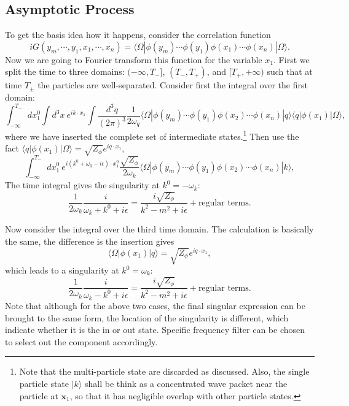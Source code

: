 \documentclass[aps,prb,superscriptaddress,nofootinbib]{revtex4}
\begin{document}
\subsection{Asymptotic Process}
To get the basis idea how it happens, consider the correlation function
\begin{equation}
	iG(y_m,\cdots,y_1,x_1,\cdots,x_n) = \langle\Omega|\phi(y_m)\cdots\phi(y_1) \phi(x_1)\cdots\phi(x_n)|\Omega\rangle.
\end{equation}
Now we are going to Fourier transform this function for the variable $x_1$.
First we split the time to three domains: $(-\infty,T_-]$, $(T_-,T_+)$, and $[T_+,+\infty)$ such that at time $T_{\pm}$ the particles are well-separated.
Consider first the integral over the first domain:
\begin{equation}
	\int_{-\infty}^{T_-} dx_1^0 \int d^3 x\ e^{i k\cdot x_1} \int \frac{d^3q}{(2\pi)^3}\frac{1}{2\omega_q}\langle \Omega|\phi(y_m)\cdots\phi(y_1) \phi(x_2)\cdots\phi(x_n)|q\rangle \langle q|\phi(x_1) |\Omega\rangle,
\end{equation}
where we have inserted the complete set of intermediate states.\footnote{Note that the multi-particle state are discarded as discussed. Also, the single particle state $|k\rangle$ shall be think as a concentrated wave packet near the particle at $\bm x_1$, so that it has negligible overlap with other particle states.}
Then use the fact $\langle q|\phi(x_1)|\Omega\rangle = \sqrt{Z_\phi} e^{i q \cdot x_1}$, 
\begin{equation}
	\int_{-\infty}^{T_-} dx_1^0 \ e^{i (k^0+\omega_q-i\epsilon)\cdot x_1^0}\frac{\sqrt{Z_\phi}}{2\omega_k}\langle \Omega|\phi(y_m)\cdots\phi(y_1) \phi(x_2)\cdots\phi(x_n)|k\rangle,
\end{equation}
The time integral gives the singularity at $k^0=-\omega_k$:
\begin{equation}
	\frac{1}{2\omega_k} \frac{i}{\omega_k+k^0 + i\epsilon} = \frac{i\sqrt{Z_\phi}}{k^2-m^2+i\epsilon} + \text{regular terms}.
\end{equation}

Now consider the integral over the third time domain.
The calculation is basically the same, the difference is the insertion gives
\begin{equation*}
	\langle\Omega| \phi(x_1) |q\rangle = \sqrt{Z_\phi} e^{i q \cdot x_1},
\end{equation*}
which leads to a singularity at $k^0=\omega_k$:
\begin{equation}
	\frac{1}{2\omega_k} \frac{i}{\omega_k-k^0 + i\epsilon} = \frac{i\sqrt{Z_\phi}}{k^2-m^2+i\epsilon} + \text{regular terms}.
\end{equation}
Note that although for the above two cases, the final singular expression can be brought to the same form, the location of the singularity is different, which indicate whether it is the in or out state.
Specific frequency filter can be chosen to select out the component accordingly.
\end{document}

